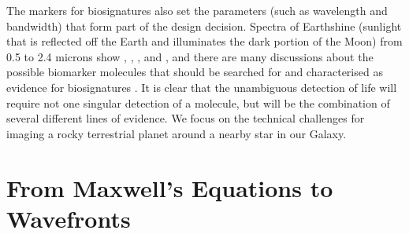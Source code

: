 \documentclass[letterpaper]{ar-1col}
\begin{document}
\begin{figure}[ht]
{%
}
  \label{fig:nstars}
\end{figure}

The markers for biosignatures also set the parameters (such as wavelength and bandwidth) that form part of the design decision.
%
Spectra of Earthshine (sunlight that is reflected off the Earth and illuminates the dark portion of the Moon) from 0.5 to 2.4 microns show , , ,  and  \citep{Turnbull06}, and there are many discussions about the possible biomarker molecules that should be searched for and characterised as evidence for biosignatures \citep[see the reviews of ][]{2016AsBio..16..465S,2017ARAA..55..433K,2018AsBio..18..663S}.
%
It is clear that the unambiguous detection of life will require not one singular detection of a molecule, but will be the combination of several different lines of evidence.
%
We focus on the technical challenges for imaging a rocky terrestrial planet around a nearby star in our Galaxy.

\section{From Maxwell's Equations to Wavefronts}\label{sec:maxwell}
\end{document}
